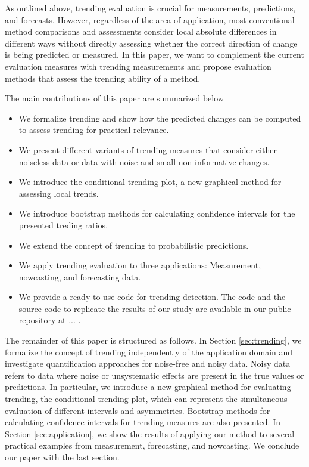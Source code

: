 As outlined above, trending evaluation is crucial for measurements, predictions, and forecasts. 
However, regardless of the area of application, most conventional method comparisons and assessments consider local absolute differences in different ways without directly assessing whether the correct direction of change is being predicted or measured. In this paper, we want to complement the current evaluation measures with trending measurements and propose evaluation methods that assess the trending ability of a method.

The main contributions of this paper are summarized below
\begin{itemize}
\item We formalize trending and show how the predicted changes can be computed to assess trending for practical relevance. 
\item We present different variants of trending measures that consider either noiseless data or data with noise and small non-informative changes.
\item We introduce the conditional trending plot, a new graphical method for assessing local trends.
\item We introduce bootstrap methods for calculating confidence intervals for the presented treding ratios.
\item We extend the concept of trending to probabilistic predictions.
\item We apply trending evaluation to three applications: Measurement, nowcasting, and forecasting data. 
\item We provide a ready-to-use code for trending detection. The code and the source code to replicate the results of our study are available in our public repository at ... .
\end{itemize}

The remainder of this paper is structured as follows. 
In Section \ref{sec:trending}, we formalize the concept of trending independently of the application domain and investigate quantification approaches for noise-free and noisy data. Noisy data refers to data where noise or unsystematic effects are present in the true values or predictions.
In particular, we introduce a new graphical method for evaluating trending, the conditional trending plot, which can represent the simultaneous evaluation of different intervals and asymmetries. 
Bootstrap methods for calculating confidence intervals for trending measures are also presented. 
In Section \ref{sec:application}, we show the results of applying our method to several practical examples from measurement, forecasting, and nowcasting. 
We conclude our paper with the last section.

